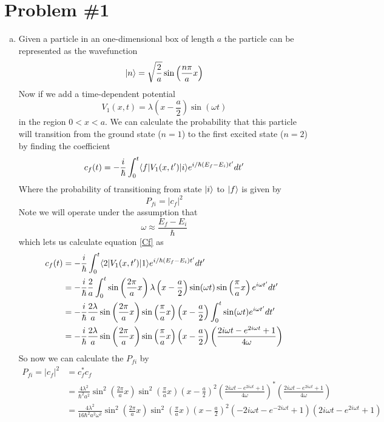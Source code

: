 \documentclass[11pt]{article}
\numberwithin{equation}{section}
\begin{document}


\section{Problem \#1}
\begin{enumerate}[(a)]
\item
Given a particle in an one-dimensional box of length $a$ the particle can be represented as the wavefunction
$$|{n}\rangle = \sqrt{\frac{2}{a}}\sin\left(\frac{n\pi}{a}x\right)$$
Now if we add a time-dependent potential 
$$V_1(x,t) = \lambda\left(x-\frac{a}{2}\right)\sin(\omega t)$$
in the region $0<x<a$. We can calculate the probability that this particle will transition from the ground state ($n=1$) to the first excited state ($n=2$) by finding the coefficient
\begin{equation}
c_f(t) = -\frac{i}{\hbar}\int_{0}^{t}\langle{f}|V_1(x,t')|{i}\rangle e^{i/\hbar(E_f-E_i)t'}dt'
\label{Cf}
\end{equation}
Where the probability of transitioning from state $|{i}\rangle$ to $|{f}\rangle$ is given by 
$$P_{fi} = |c_f|^2$$
Note we will operate under the assumption that 
$$\omega\approx \frac{E_f-E_i}{\hbar}$$
which lets us calculate equation \ref{Cf} as
\begin{align*}
c_f(t) &= -\frac{i}{\hbar}\int_{0}^{t}\langle{2}|V_1(x,t')|{1}\rangle e^{i/\hbar(E_f-E_i)t'}dt'\\
&= -\frac{i}{\hbar}\frac{2}{a}\int_{0}^{t}\sin\left(\frac{2\pi}{a}x\right)\lambda\left(x-\frac{a}{2}\right)\sin(\omega t)\sin\left(\frac{\pi}{a}x\right)e^{i\omega t'}dt'\\
&= -\frac{i}{\hbar}\frac{2\lambda}{a}\sin\left(\frac{2\pi}{a}x\right)\sin\left(\frac{\pi}{a}x\right)\left(x-\frac{a}{2}\right)\int_{0}^{t}\sin(\omega t)e^{i\omega t'}dt'\\
&= -\frac{i}{\hbar}\frac{2\lambda}{a}\sin\left(\frac{2\pi}{a}x\right)\sin\left(\frac{\pi}{a}x\right)\left(x-\frac{a}{2}\right)\left(\frac{2i\omega t - e^{2i\omega t}+1}{4\omega}\right)
\end{align*}
So now we can calculate the $P_{fi}$ by
\begin{align*}
P_{fi} = |c_f|^2 &= c_f^*c_f\\
&= \frac{4\lambda^2}{\hbar^2a^2}\sin^2\left(\frac{2\pi}{a}x\right)\sin^2\left(\frac{\pi}{a}x\right)\left(x-\frac{a}{2}\right)^2\left(\frac{2i\omega t - e^{2i\omega t}+1}{4\omega}\right)^*\left(\frac{2i\omega t - e^{2i\omega t}+1}{4\omega}\right)\\
&= \frac{4\lambda^2}{16\hbar^2a^2\omega^2}\sin^2\left(\frac{2\pi}{a}x\right)\sin^2\left(\frac{\pi}{a}x\right)\left(x-\frac{a}{2}\right)^2(-2i\omega t - e^{-2i\omega t}+1)(2i\omega t - e^{2i\omega t}+1)\\

\end{align*}
\end{enumerate}
\end{document}
